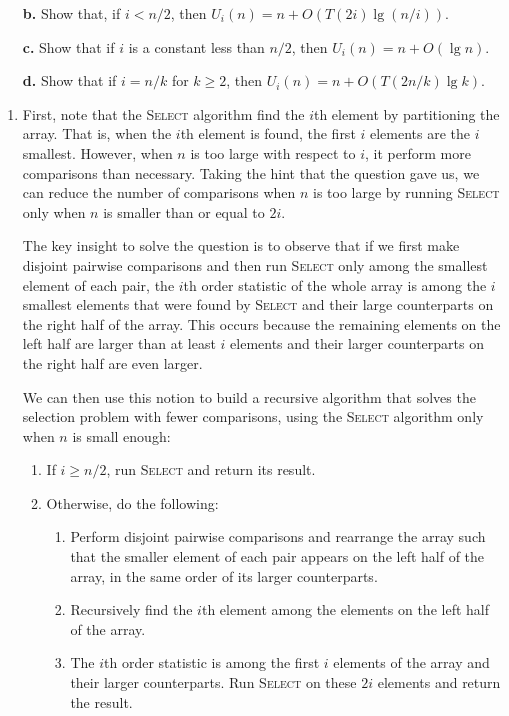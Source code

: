\begin{enumerate}
{\begin{enumerate}
(\emph{Hint:} Begin with $\floor{n/2}$ disjoint pairwise comparisons, and
recurse on the set containing the smaller element from each pair.)

\item[\textbf{b.}] Show that, if $i < n/2$, then $U_i(n) = n + O(T(2i) \lg (n/i))$.

\item[\textbf{c.}] Show that if $i$ is a constant less than $n/2$, then $U_i(n) = n + O(\lg n)$.

\item[\textbf{d.}] Show that if $i = n/k$ for $k \ge 2$, then $U_i(n) = n + O(T(2n/k) \lg k)$.
\end{enumerate}
}

\begin{framed}
\begin{enumerate}
\item First, note that the \textsc{Select} algorithm find the $i$th element by
partitioning the array. That is, when the $i$th element is found, the first $i$
elements are the $i$ smallest. However, when $n$ is too large with respect to
$i$, it perform more comparisons than necessary. Taking the hint that the
question gave us, we can reduce the number of comparisons when $n$ is too large
by running \textsc{Select} only when $n$ is smaller than or equal to $2i$.

The key insight to solve the question is to observe that if we first make
disjoint pairwise comparisons and then run \textsc{Select} only among the
smallest element of each pair, the $i$th order statistic of the whole array is
among the $i$ smallest elements that were found by \textsc{Select} and their
large counterparts on the right half of the array. This occurs because the
remaining elements on the left half are larger than at least $i$ elements and
their larger counterparts on the right half are even larger.

We can then use this notion to build a recursive algorithm that solves the
selection problem with fewer comparisons, using the \textsc{Select} algorithm
only when $n$ is small enough:
\begin{enumerate}
  \item If $i \ge n/2$, run \textsc{Select} and return its result.
  \item Otherwise, do the following:
  \begin{enumerate}
    \item Perform disjoint pairwise comparisons and rearrange the array such
      that the smaller element of each pair appears on the left half of the
      array, in the same order of its larger counterparts.
    \item Recursively find the $i$th element among the elements on the left half
      of the array.
    \item The $i$th order statistic is among the first $i$ elements of the array
      and their larger counterparts. Run \textsc{Select} on these $2i$ elements
      and return the result.
  \end{enumerate}
\end{enumerate}


\end{enumerate}
\end{framed}
\end{enumerate}
